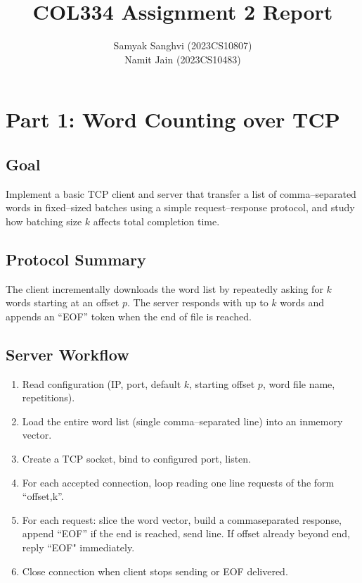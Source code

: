 \documentclass[11pt,a4paper]{article}
\title{COL334 Assignment 2 Report}
\author{Samyak Sanghvi (2023CS10807) \\ Namit Jain (2023CS10483)}
\begin{document}
\maketitle

\section{Part 1: Word Counting over TCP}
\subsection{Goal}
Implement a basic TCP client and server that transfer a list of comma--separated words in fixed--sized batches using a simple request--response protocol, and study how batching size $k$ affects total completion time.

\subsection{Protocol Summary}
The client incrementally downloads the word list by repeatedly asking for $k$ words starting at an offset $p$. The server responds with up to $k$ words and appends an ``EOF'' token when the end of file is reached.

\subsection{Server Workflow}
\begin{enumerate}[leftmargin=1.2cm]
  \item Read configuration (IP, port, default $k$, starting offset $p$, word file name, repetitions).
  \item Load the entire word list (single comma--separated line) into an in\-memory vector.
  \item Create a TCP socket, bind to configured port, listen.
  \item For each accepted connection, loop reading one line requests of the form ``offset,k''.
  \item For each request: slice the word vector, build a comma\-separated response, append ``EOF'' if the end is reached, send line. If offset already beyond end, reply ``EOF" immediately.
  \item Close connection when client stops sending or EOF delivered.
\end{enumerate}
\end{document}
